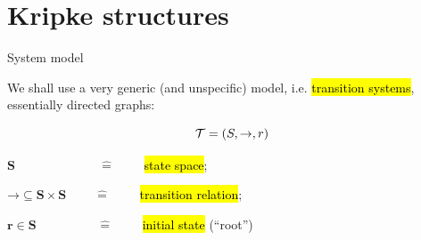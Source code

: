 
\section{Kripke structures}


\begin{frame}{System model}

We shall use a very generic (and unspecific) model, i.e.
  \hl{transition systems}, essentially directed graphs:

\begin{equation*}
  {\cal T}=(S,\mathord{\to},r)
\end{equation*}
  
\bigskip
 $\mathbf{S}\qquad\qquad\qquad\>\>\>\widehat=\qquad$
  \hl{state space}; 
  \\ \vspace{.1cm}\quad{}

  \bigskip
 $\mathbf{\mathord{\to}\subseteq S\times S}\qquad\>\widehat=\qquad$
   \hl{transition relation}; 
   \\ \vspace{.1cm}\quad{}
  
  \bigskip
 $\mathbf{r\in S}\qquad\qquad\,\ \ \ \widehat=\qquad$
    \hl{initial state} (``root'')

\end{frame}



